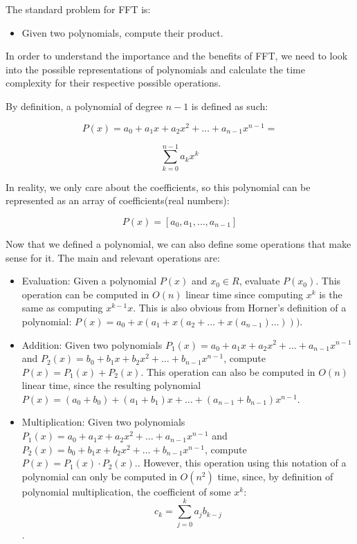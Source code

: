 \documentclass[letterpaper]{article}
\begin{document}
The standard problem for FFT is:

\begin{itemize}
    \item Given two polynomials, compute their product.
\end{itemize}

In order to understand the importance and the benefits of FFT, we need to look into the possible representations of polynomials and calculate the time complexity for their respective possible operations.

By definition, a polynomial of degree $n-1$ is defined as such:

$$
P(x)=a_{0} + a_{1}x + a_{2}x^{2}+ \dots + a_{n-1}x^{n-1}=
$$

$$
\sum_{k=0}^{n-1}a_{k}x^{k}
$$

In reality, we only care about the coefficients, so this polynomial can be represented as an array of coefficients(real numbers):

$$
P(x) = [a_{0}, a_{1}, \dots , a_{n-1}]
$$

Now that we defined a polynomial, we can also define some operations that make sense for it. The main and relevant operations are:

\begin{itemize}
    \item Evaluation: Given a polynomial $P(x)$ and $x_{0} \in {R}$, evaluate $P(x_{0})$. This operation can be computed in $O(n)$ linear time since computing $x^{k}$ is the same as computing $x^{k - 1}x$. This is also obvious from Horner's definition of a polynomial: $P(x) = a_{0} + x(a_{1} + x(a_{2} + \dots + x(a_{n-1})\dots)))$.
    
    \item Addition: Given two polynomials $P_{1}(x)=a_{0} + a_{1}x + a_{2}x^{2}+ \dots + a_{n-1}x^{n-1}$ and $P_{2}(x)=b_{0} + b_{1}x + b_{2}x^{2}+ \dots + b_{n-1}x^{n-1}$, compute $P(x) = P_{1}(x) + P_{2}(x)$. This operation can also be computed in $O(n)$ linear time, since the resulting polynomial $P(x)=(a_{0} + b_{0}) + (a_{1} + b_{1})x + \dots + (a_{n-1} + b_{n-1})x^{n-1}$.
    
    \item Multiplication: Given two polynomials $P_{1}(x)=a_{0} + a_{1}x + a_{2}x^{2}+ \dots + a_{n-1}x^{n-1}$ and $P_{2}(x)=b_{0} + b_{1}x + b_{2}x^{2}+ \dots + b_{n-1}x^{n-1}$, compute $P(x) = P_{1}(x) \cdot P_{2}(x)$.. However, this operation using this notation of a polynomial can only be computed in $O(n^{2})$ time, since, by definition of polynomial multiplication, the coefficient of some $x^{k}$:
    $$c_{k} = \sum_{j=0}^{k}a_{j}b_{k - j}$$.
\end{itemize}
\end{document}
